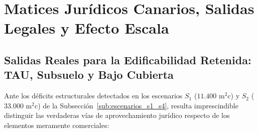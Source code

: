 \section{Matices Jurídicos Canarios, Salidas Legales y Efecto Escala}
\label{sec:realidad_juridica}

\subsection{Salidas Reales para la Edificabilidad Retenida: TAU, Subsuelo y Bajo Cubierta}
\label{sub:salidas_tau}

Ante los déficits estructurales detectados en los escenarios $S_1$ ($11.400\text{ m}^2\text{c}$) y $S_2$ ($33.000\text{ m}^2\text{c}$) de la Subsección~\ref{sub:escenarios_s1_s4}, resulta imprescindible distinguir las verdaderas vías de aprovechamiento jurídico respecto de los elementos meramente comerciales:

